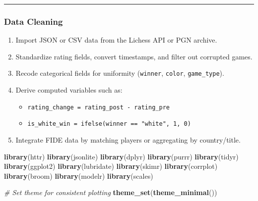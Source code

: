\documentclass[
]{article}
\newenvironment{Shaded}{\begin{snugshade}}{\end{snugshade}}
\newcommand{\CommentTok}[1]{\textcolor[rgb]{0.56,0.35,0.01}{\textit{#1}}}
\newcommand{\FunctionTok}[1]{\textcolor[rgb]{0.13,0.29,0.53}{\textbf{#1}}}
\newcommand{\NormalTok}[1]{#1}
\providecommand{\tightlist}{%
  \setlength{\itemsep}{0pt}\setlength{\parskip}{0pt}}
\begin{document}
\begin{center}\rule{0.5\linewidth}{0.5pt}\end{center}

\subsubsection{Data Cleaning}\label{data-cleaning}

\begin{enumerate}
\def\labelenumi{\arabic{enumi}.}
\tightlist
\item
  Import JSON or CSV data from the Lichess API or PGN archive.\\
\item
  Standardize rating fields, convert timestamps, and filter out
  corrupted games.\\
\item
  Recode categorical fields for uniformity (\texttt{winner},
  \texttt{color}, \texttt{game\_type}).\\
\item
  Derive computed variables such as:

  \begin{itemize}
  \tightlist
  \item
    \texttt{rating\_change\ =\ rating\_post\ -\ rating\_pre}
  \item
    \texttt{is\_white\_win\ =\ ifelse(winner\ ==\ "white",\ 1,\ 0)}
  \end{itemize}
\item
  Integrate FIDE data by matching players or aggregating by
  country/title.
\end{enumerate}

\begin{Shaded}
\begin{Highlighting}[]
\FunctionTok{library}\NormalTok{(httr)}
\FunctionTok{library}\NormalTok{(jsonlite)}
\FunctionTok{library}\NormalTok{(dplyr)}
\FunctionTok{library}\NormalTok{(purrr)}
\FunctionTok{library}\NormalTok{(tidyr)}
\FunctionTok{library}\NormalTok{(ggplot2)}
\FunctionTok{library}\NormalTok{(lubridate)}
\FunctionTok{library}\NormalTok{(skimr)}
\FunctionTok{library}\NormalTok{(corrplot)}
\FunctionTok{library}\NormalTok{(broom)}
\FunctionTok{library}\NormalTok{(modelr)}
\FunctionTok{library}\NormalTok{(scales)}

\CommentTok{\# Set theme for consistent plotting}
\FunctionTok{theme\_set}\NormalTok{(}\FunctionTok{theme\_minimal}\NormalTok{())}
\end{Highlighting}
\end{Shaded}
\end{document}
